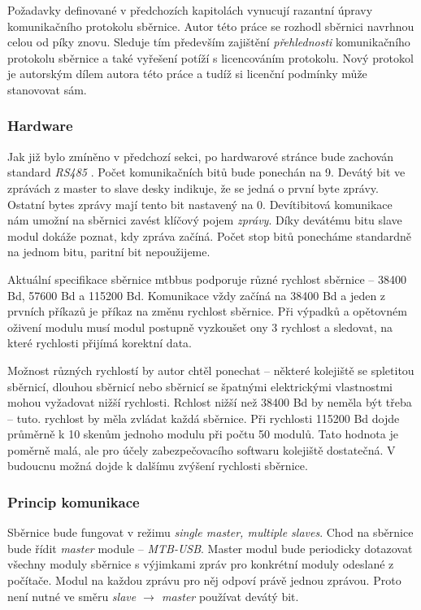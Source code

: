 Požadavky definované v předchozích kapitolách vynucují razantní úpravy
komunikačního protokolu sběrnice. Autor této práce se rozhodl sběrnici
navrhnou celou od píky znovu. Sleduje tím především zajištění
\textit{přehlednosti} komunikačního protokolu sběrnice a také vyřešení potíží s
licencováním protokolu. Nový protokol je autorským dílem autora této práce
a tudíž si licenční podmínky může stanovovat sám.

\subsubsection{Hardware}

Jak již bylo zmíněno v předchozí sekci, po hardwarové stránce bude zachován
standard \textit{RS485} \cite{rs485}. Počet komunikačních bitů bude ponechán na 9.
Devátý bit ve zprávách z master to slave desky indikuje, že se jedná o první
byte zprávy. Ostatní bytes zprávy mají tento bit nastavený na 0. Devítibitová
komunikace nám umožní na sběrnici zavést klíčový pojem \textit{zprávy}. Díky
devátému bitu slave modul dokáže poznat, kdy zpráva začíná. Počet stop bitů
ponecháme standardně na jednom bitu, paritní bit nepoužijeme.

Aktuální specifikace sběrnice \gls{mtbbus} podporuje různé rychlost sběrnice –
38400 Bd, 57600 Bd a 115200 Bd. Komunikace vždy začíná na 38400 Bd a jeden
z prvních příkazů je příkaz na změnu rychlost sběrnice. Při výpadků a opětovném
oživení modulu musí modul postupně vyzkoušet ony 3 rychlost a sledovat, na které
rychlosti přijímá korektní data.

Možnost různých rychlostí by autor chtěl ponechat – některé kolejiště se
spletitou sběrnicí, dlouhou sběrnicí nebo sběrnicí se špatnými elektrickými
vlastnostmi mohou vyžadovat nižší rychlosti. Rchlost nižší než 38400 Bd by
neměla být třeba – tuto. rychlost by měla zvládat každá sběrnice. Při rychlosti
115200 Bd dojde průměrně k 10 skenům jednoho modulu při počtu 50 modulů.
Tato hodnota je poměrně malá, ale pro účely zabezpečovacího softwaru kolejiště
dostatečná. V budoucnu možná dojde k dalšímu zvýšení rychlosti sběrnice.


\subsubsection{Princip komunikace}

Sběrnice bude fungovat v režimu \textit{single master, multiple slaves}. Chod
na sběrnice bude řídit \textit{master} module – \textit{MTB-USB}. Master modul
bude periodicky dotazovat všechny moduly sběrnice s výjimkami zpráv pro konkrétní
moduly odeslané z počítače. Modul na každou zprávu pro něj odpoví právě jednou
zprávou. Proto není nutné ve směru \textit{slave $\rightarrow$ master} používat
devátý bit.


